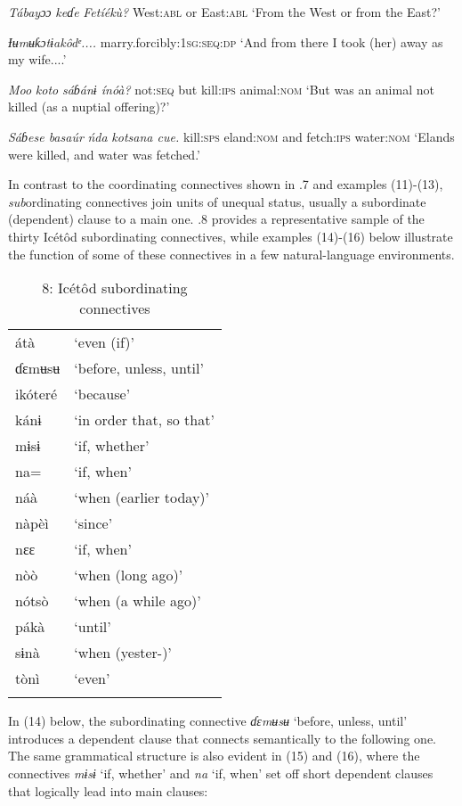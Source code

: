 \textit{Tábayɔɔ   }\textit{keɗe}\textit{   Fetíékù?}
West:\textsc{abl}   or   East:\textsc{abl}
‘From the West or from the East?’



\textit{Ɨʉmʉƙɔtɨakôdᵉ.... }
marry.forcibly:\textsc{1sg:seq:dp}
‘And from there I took (her) away as my wife....’

\textit{Moo     }\textit{koto}\textit{   sáɓánɨ   ínóà?}
not:\textsc{seq}   but   kill:\textsc{ips}   animal:\textsc{nom}
‘But was an animal not killed (as a nuptial offering)?’



\textit{Sáɓese   basaúr   }\textit{ńda}\textit{   kotsana   cue.}
kill:\textsc{sps}  eland:\textsc{nom}   and   fetch:\textsc{ips} water:\textsc{nom}
‘Elands were killed, and water was fetched.’

In contrast to the coordinating connectives shown in .7 and examples (11)-(13), \textit{sub}ordinating connectives join units of unequal status, usually a subordinate (dependent) clause to a main one. .8 provides a representative sample of the thirty Icétôd subordinating connectives, while examples (14)-(16) below illustrate the function of some of these connectives in a few natural-language environments.


\begin{table}
\caption{8: Icétôd subordinating connectives}
\label{tab:3}


\begin{tabularx}{\textwidth}{XX}
\lsptoprule

átà & ‘even (if)’\\
ɗɛmʉsʉ & ‘before, unless, until’\\
ikóteré & ‘because’\\
kánɨ & ‘in order that, so that’\\
mɨsɨ & ‘if, whether’\\
na= & ‘if, when’\\
náà & ‘when (earlier today)’\\
nàpèì & ‘since’\\
nɛɛ & ‘if, when’\\
nòò & ‘when (long ago)’\\
nótsò & ‘when (a while ago)’\\
pákà & ‘until’\\
sɨnà & ‘when (yester-)’\\
tònì & ‘even’\\
\lspbottomrule
\end{tabularx}
\end{table}
In (14) below, the subordinating connective \textit{ɗɛmʉsʉ }‘before, unless, until’ introduces a dependent clause that connects semantically to the following one. The same grammatical structure is also evident in (15) and (16), where the connectives \textit{mɨsɨ }‘if, whether’ and \textit{na }‘if, when’ set off short dependent clauses that logically lead into main clauses:



